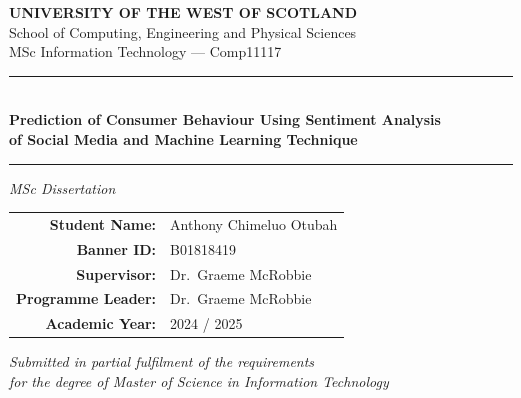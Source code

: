 \begin{titlepage}
  \centering
  \vspace*{1cm}
  {\large \textbf{\color{uwsblue} UNIVERSITY OF THE WEST OF SCOTLAND}}\\[0.4em]
  {\normalsize School of Computing, Engineering and Physical Sciences}\\[0.3em]
  {\normalsize MSc Information Technology --- Comp11117}
  \vspace{1.5cm}
  \rule{\linewidth}{1.5pt}\\[0.6em]
  {\LARGE \bfseries \color{uwsblue}
    Prediction of Consumer Behaviour Using Sentiment Analysis\\[0.4em]
    of Social Media and Machine Learning Technique}\\[0.6em]
  \rule{\linewidth}{1.5pt}
  \vspace{1.2cm}
  {\large \textit{MSc Dissertation}}
  \vfill
  \begin{tabular}{rl}
    \textbf{Student Name:}    & Anthony Chimeluo Otubah \\[4pt]
    \textbf{Banner ID:}       & B01818419 \\[4pt]
    \textbf{Supervisor:}      & Dr.\ Graeme McRobbie \\[4pt]
    \textbf{Programme Leader:}& Dr.\ Graeme McRobbie \\[4pt]
    \textbf{Academic Year:}   & 2024 / 2025 \\
  \end{tabular}
  \vspace{1.5cm}
  {\small \textit{Submitted in partial fulfilment of the requirements\\
  for the degree of Master of Science in Information Technology}}
\end{titlepage}
\thispagestyle{empty}
\cleardoublepage
